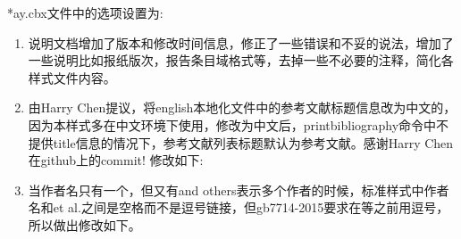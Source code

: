 \begin{enumerate}
*ay.cbx文件中的选项设置为:
\begin{texlist}
\end{texlist}
\end{enumerate}

\begin{enumerate}
\item 说明文档增加了版本和修改时间信息，修正了一些错误和不妥的说法，增加了一些说明比如报纸版次，报告条目域格式等，去掉一些不必要的注释，简化各样式文件内容。

\item 由Harry Chen提议，将english本地化文件中的参考文献标题信息改为中文的，因为本样式多在中文环境下使用，修改为中文后，printbibliography命令中不提供title信息的情况下，参考文献列表标题默认为参考文献。感谢Harry Chen在github上的commit!
修改如下:
\begin{texlist}
\end{texlist}


\item 当作者名只有一个，但又有and others表示多个作者的时候，标准样式中作者名和et al.之间是空格而不是逗号链接，但gb7714-2015要求在等之前用逗号，所以做出修改如下。

\begin{texlist}
\end{texlist}


\end{enumerate}
